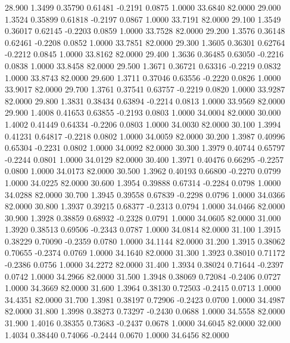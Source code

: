   28.900   1.3499   0.35790   0.61481  -0.2191   0.0875   1.0000  33.6840  82.0000
  29.000   1.3524   0.35899   0.61818  -0.2197   0.0867   1.0000  33.7191  82.0000
  29.100   1.3549   0.36017   0.62145  -0.2203   0.0859   1.0000  33.7528  82.0000
  29.200   1.3576   0.36148   0.62461  -0.2208   0.0852   1.0000  33.7851  82.0000
  29.300   1.3605   0.36301   0.62764  -0.2212   0.0845   1.0000  33.8162  82.0000
  29.400   1.3636   0.36485   0.63050  -0.2216   0.0838   1.0000  33.8458  82.0000
  29.500   1.3671   0.36721   0.63316  -0.2219   0.0832   1.0000  33.8743  82.0000
  29.600   1.3711   0.37046   0.63556  -0.2220   0.0826   1.0000  33.9017  82.0000
  29.700   1.3761   0.37541   0.63757  -0.2219   0.0820   1.0000  33.9287  82.0000
  29.800   1.3831   0.38434   0.63894  -0.2214   0.0813   1.0000  33.9569  82.0000
  29.900   1.4008   0.41653   0.63855  -0.2193   0.0803   1.0000  34.0004  82.0000
  30.000   1.4002   0.41449   0.64334  -0.2206   0.0803   1.0000  34.0030  82.0000
  30.100   1.3994   0.41231   0.64817  -0.2218   0.0802   1.0000  34.0059  82.0000
  30.200   1.3987   0.40996   0.65304  -0.2231   0.0802   1.0000  34.0092  82.0000
  30.300   1.3979   0.40744   0.65797  -0.2244   0.0801   1.0000  34.0129  82.0000
  30.400   1.3971   0.40476   0.66295  -0.2257   0.0800   1.0000  34.0173  82.0000
  30.500   1.3962   0.40193   0.66800  -0.2270   0.0799   1.0000  34.0225  82.0000
  30.600   1.3954   0.39888   0.67314  -0.2284   0.0798   1.0000  34.0288  82.0000
  30.700   1.3945   0.39558   0.67839  -0.2298   0.0796   1.0000  34.0366  82.0000
  30.800   1.3937   0.39215   0.68377  -0.2313   0.0794   1.0000  34.0466  82.0000
  30.900   1.3928   0.38859   0.68932  -0.2328   0.0791   1.0000  34.0605  82.0000
  31.000   1.3920   0.38513   0.69506  -0.2343   0.0787   1.0000  34.0814  82.0000
  31.100   1.3915   0.38229   0.70090  -0.2359   0.0780   1.0000  34.1144  82.0000
  31.200   1.3915   0.38062   0.70655  -0.2374   0.0769   1.0000  34.1640  82.0000
  31.300   1.3923   0.38010   0.71172  -0.2386   0.0756   1.0000  34.2272  82.0000
  31.400   1.3934   0.38024   0.71644  -0.2397   0.0742   1.0000  34.2966  82.0000
  31.500   1.3948   0.38069   0.72084  -0.2406   0.0727   1.0000  34.3669  82.0000
  31.600   1.3964   0.38130   0.72503  -0.2415   0.0713   1.0000  34.4351  82.0000
  31.700   1.3981   0.38197   0.72906  -0.2423   0.0700   1.0000  34.4987  82.0000
  31.800   1.3998   0.38273   0.73297  -0.2430   0.0688   1.0000  34.5558  82.0000
  31.900   1.4016   0.38355   0.73683  -0.2437   0.0678   1.0000  34.6045  82.0000
  32.000   1.4034   0.38440   0.74066  -0.2444   0.0670   1.0000  34.6456  82.0000
